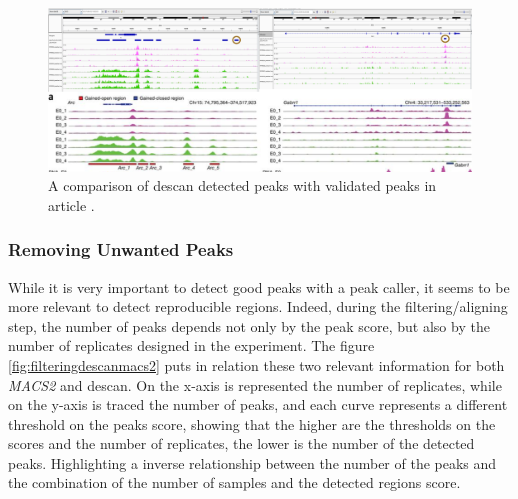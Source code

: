 \begin{figure}[H]
\includegraphics[width=\textwidth,height=\textheight,keepaspectratio]{img/descan2/peaks.png}
\caption[\gls{descan} peaks detection]{A comparison of \gls{descan} detected peaks with validated peaks in article \cite{Su2017}.}
\label{fig:peaksdescan}
\centering
\end{figure}

\subsubsection{Removing Unwanted Peaks}

While it is very important to detect good peaks with a peak caller, it seems to be more relevant to detect reproducible regions. 
Indeed, during the filtering/aligning step, the number of peaks depends not only by the peak score, but also by the number of replicates designed in the experiment.
The figure \ref{fig:filteringdescanmacs2} puts in relation these two relevant information for both \textit{MACS2} and \gls{descan}. 
On the x-axis is represented the number of replicates, while on the y-axis is traced the number of peaks, and each curve represents a different threshold on the peaks score, showing that the higher are the thresholds on the scores and the number of replicates, the lower is the number of the detected peaks.
Highlighting a inverse relationship between the number of the peaks and the combination of the number of samples and the detected regions score.

